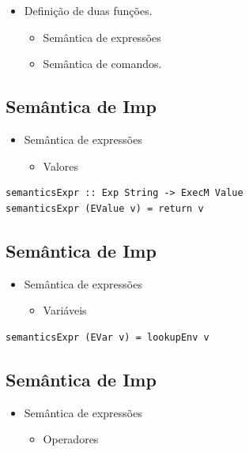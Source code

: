 \documentclass[11pt]{article}
\begin{document}
\begin{itemize}
\item Definição de duas funções.
\begin{itemize}
\item Semântica de expressões
\item Semântica de comandos.
\end{itemize}
\end{itemize}
\subsection*{Semântica de Imp}
\label{sec:org71a8f5f}

\begin{itemize}
\item Semântica de expressões
\begin{itemize}
\item Valores
\end{itemize}
\end{itemize}

\begin{verbatim}
semanticsExpr :: Exp String -> ExecM Value
semanticsExpr (EValue v) = return v
\end{verbatim}
\subsection*{Semântica de Imp}
\label{sec:org7b81d6f}

\begin{itemize}
\item Semântica de expressões
\begin{itemize}
\item Variáveis
\end{itemize}
\end{itemize}

\begin{verbatim}
semanticsExpr (EVar v) = lookupEnv v
\end{verbatim}
\subsection*{Semântica de Imp}
\label{sec:org32e5f22}

\begin{itemize}
\item Semântica de expressões
\begin{itemize}
\item Operadores
\end{itemize}
\end{itemize}
\end{document}
